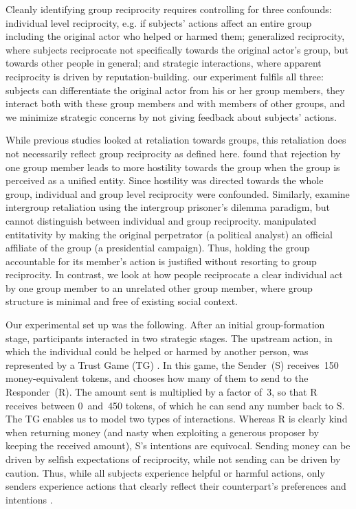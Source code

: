\documentclass[12pt,a4paper]{article}\usepackage[]{graphicx}\usepackage[]{color}
\begin{document}
Cleanly identifying group reciprocity requires controlling for three confounds: individual level reciprocity, e.g. if subjects' actions affect an entire group including the original actor who helped or harmed them; generalized reciprocity, where subjects reciprocate not specifically towards the original actor’s group, but towards other people in general; and strategic interactions, where apparent reciprocity is driven by reputation-building. 
our experiment fulfils all three: subjects can differentiate the original actor from his or her group members, they interact both with these group members and with members of other groups, and we minimize strategic concerns by not giving feedback about subjects' actions.


While previous studies looked at retaliation towards groups, this retaliation does not necessarily reflect group reciprocity as defined here. \citet{gaertner2008whenrejection} found that rejection by one group member leads to more hostility towards the group when the group is perceived as a unified entity. Since hostility was directed towards the whole group, individual and group level reciprocity were confounded. Similarly, \citet{bohm2016makes} examine intergroup retaliation using the intergroup prisoner's
dilemma paradigm, but cannot distinguish between individual and group reciprocity.
\citet{stenstrom2008theroles} manipulated entitativity by making the original perpetrator (a political analyst) an official affiliate of the group (a presidential campaign). Thus, holding the group accountable for its member's action is justified without resorting to group reciprocity. In contrast, we look at how people reciprocate a clear individual act by one group member to an unrelated other group member, where group structure is minimal and free of existing social context. 


Our experimental set up was the following. After an initial group-formation stage, participants interacted in two strategic stages. The upstream action, in which the individual could be helped  or harmed by another person, was represented by a Trust Game (TG) \citep{berg1995trust}.  In this game, the Sender~(S) receives~150 money-equivalent tokens, and chooses how many of them to send to the Responder~(R). The amount sent is multiplied by a factor of~3, so that R receives between 0~and~450 tokens, of which he can send any number back to S. The TG enables us to model two types of interactions. Whereas R is clearly kind when returning money (and nasty when exploiting a generous proposer by keeping the received amount), S's intentions are equivocal. Sending money can be driven by selfish expectations of reciprocity, while not sending can be driven by caution. Thus, while all subjects experience helpful or harmful actions, only senders experience actions that clearly reflect their counterpart's preferences and intentions \citep{gunnthorsdottir2002using,kimbrough2015norms}.
\end{document}
